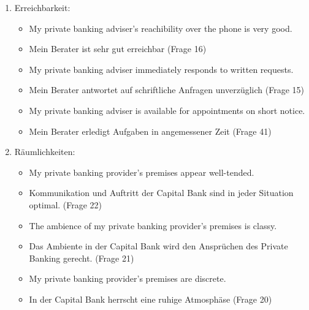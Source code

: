 \documentclass{article}\usepackage[]{graphicx}\usepackage[]{color}
\begin{document}
\begin{enumerate} %

    \item Erreichbarkeit: %
    \begin{itemize} %
        \item My private banking adviser's reachibility over the phone is very good.
        \item Mein Berater ist sehr gut erreichbar (Frage 16)
        \item My private banking adviser immediately responds to written requests.
        \item Mein Berater antwortet auf schriftliche Anfragen unverzüglich (Frage 15)
        \item My private banking adviser is available for appointments on short notice.
        \item Mein Berater erledigt Aufgaben in angemessener Zeit (Frage 41)
    \end{itemize} %
    
    \item Räumlichkeiten:
    \begin{itemize}
        \item My private banking provider’s premises appear well-tended. 
        \item Kommunikation und Auftritt der Capital Bank sind in jeder Situation optimal. (Frage 22)
        \item The ambience of my private banking provider’s premises is classy.
        \item Das Ambiente in der Capital Bank wird den Ansprüchen des Private Banking gerecht. (Frage 21)
        \item My private banking provider’s premises are discrete.
        \item In der Capital Bank herrscht eine ruhige Atmosphäse (Frage 20)
    \end{itemize}
    
   
   
    
   
    
    

\end{enumerate}
\end{document}
